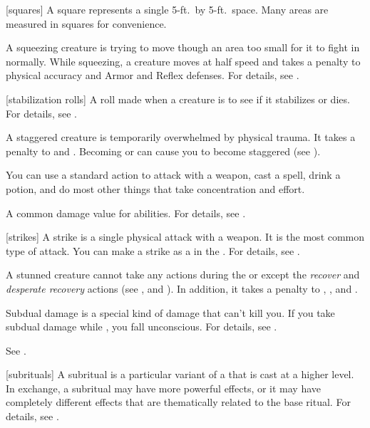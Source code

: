 [squares] A square represents a single 5-ft.\ by 5-ft.\ space.
Many areas are measured in squares for convenience.

 A squeezing creature is trying to move though an area too small for it to fight in normally.
While squeezing, a creature moves at half speed and takes a  penalty to physical accuracy and Armor and Reflex defenses.
For details, see .

[stabilization rolls] A roll made when a creature is  to see if it stabilizes or dies. For details, see .

 A staggered creature is temporarily overwhelmed by physical trauma.
It takes a  penalty to  and .
Becoming  or  can cause you to become staggered (see ).

 You can use a standard action to attack with a weapon, cast a spell, drink a potion, and do most other things that take concentration and effort.

 A common damage value for abilities.
For details, see .

[strikes] A strike is a single physical attack with a weapon.
It is the most common type of attack.
You can make a strike as a  in the .
For details, see .

 A stunned creature cannot take any actions during the  or  except the \textit{recover} and \textit{desperate recovery} actions (see , and ).
In addition, it takes a  penalty to , , and .

 Subdual damage is a special kind of damage that can't kill you.
If you take subdual damage while , you fall unconscious.
For details, see .

 See .

[subrituals] A subritual is a particular variant of a  that is cast at a higher level.
In exchange, a subritual may have more powerful effects, or it may have completely different effects that are thematically related to the base ritual.
For details, see .

